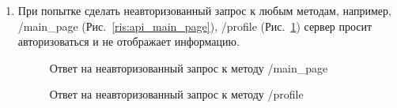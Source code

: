 \documentclass{../includes/TechDoc}
\begin{document}
    \begin{enumerate}
        \item При попытке сделать неавторизованный запрос к любым методам, например, /main\_page (Рис.~\ref{ris:api_main_page}), /profile (Рис.~\ref{ris:api_profile}) сервер просит авторизоваться и не отображает информацию.
        \begin{figure}[ht]
            \begin{center}
                \begin{minipage}[ht]{0.49\linewidth}
                    \caption{Ответ на неавторизованный запрос к методу /main\_page} %
                    \label{ris:api_main_page} %
                \end{minipage}
                \hfill
                \begin{minipage}[ht]{0.49\linewidth}
                    \caption{Ответ на неавторизованный запрос к методу /profile}
                    \label{ris:api_profile}
                \end{minipage}
            \end{center}
        \end{figure}


\end{enumerate}
\end{document}
